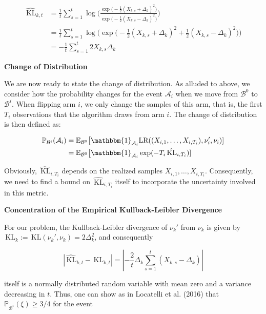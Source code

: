 \documentclass[11pt,]{article}
\newcommand{\KL}{\,\text{KL}}
\begin{document}
\begin{align*}
\hat{\KL}_{k,t} & = \frac{1}{t} \sum_{s=1}^{t} \log \Big(\frac{\exp \big(-\frac{1}{2} (X_{k,s}+\Delta_k)^2\big)}{\exp \big(-\frac{1}{2} (X_{k,s}-\Delta_k)^2\big)} \Big) \\
& = \frac{1}{t} \sum_{s=1}^{t} \log \Big( \exp \big(-\frac{1}{2} (X_{k,s}+\Delta_k)^2 + \frac{1}{2} (X_{k,s}-\Delta_k)^2 \big) \Big) \\
& = - \frac{1}{t} \sum_{s=1}^{t} 2 X_{k,s} \Delta_k
\end{align*}

\textbf{Change of Distribution}

We are now ready to state the change of distribution. As alluded to
above, we consider how the probability changes for the event
\(\mathcal{A}_i\) when we move from \(\mathcal{B}^0\) to
\(\mathcal{B}^i\). When flipping arm \(i\), we only change the samples
of this arm, that is, the first \(T_i\) observations that the algorithm
draws from arm \(i\). The change of distribution is then defined as:

\begin{align*}
\mathbb{P}_{\mathcal{B}^i}(\mathcal{A}_i) & = \mathbb{E}_{\mathcal{B}^0} \big[\mathbbm{1}_{\mathcal{A}_i} \text{LR}((X_{i,1}, \dots,X_{i,T_i}), \nu_i', \nu_i) ] \\
& = \mathbb{E}_{\mathcal{B}^0} \big[\mathbbm{1}_{\mathcal{A}_i} \exp (- T_i \hat{\KL}_{i,T_i}) ]
\end{align*}

Obviously, \(\hat{\KL}_{i,T_i}\) depends on the realized samples
\(X_{i,1}, \dots,X_{i,T_i}\). Consequently, we need to find a bound on
\(\hat{\KL}_{i,T_i}\) itself to incorporate the uncertainty involved in
this metric.

\textbf{Concentration of the Empirical Kullback-Leibler Divergence}

For our problem, the Kullback-Leibler divergence of \(\nu_k'\) from
\(\nu_k\) is given by \(\KL_k := \KL(\nu_k', \nu_k) = 2\Delta_k^2\), and
consequently

\begin{equation*}
|\hat{\KL}_{k,t} - \KL_{k,t}| = |-\frac{2}{t} \Delta_k \sum_{s=1}^{t}(X_{k,s} - \Delta_k)|
\end{equation*}

itself is a normally distributed random variable with mean zero and a
variance decreasing in \(t\). Thus, one can show as in Locatelli et al.
(2016) that \(\mathbb{P}_{\mathcal{B}^i}(\xi) \geq 3/4\) for the event
\end{document}
